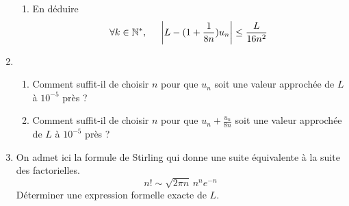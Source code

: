 \begin{enumerate}
\begin{enumerate}
 \item En déduire
\begin{displaymath}
 \forall k\in \mathbb{N}^*, \hspace{0.5cm}
 \left| L-(1+\frac{1}{8n})u_n\right| \leq \frac{L}{16n^2} 
\end{displaymath}
\end{enumerate}

 \item 
\begin{enumerate}
 \item Comment suffit-il de choisir $n$ pour que $u_n$ soit une valeur approchée de $L$ à $10^{-5}$ près ?
 \item Comment suffit-il de choisir $n$ pour que $u_n +\frac{u_n}{8n}$ soit une valeur approchée de $L$ à $10^{-5}$ près ?
\end{enumerate}


 \item
On admet ici la formule de Stirling qui donne une suite équivalente à la suite des factorielles.
\begin{displaymath}
 n! \sim \sqrt{2\pi n}\,n^n e^{-n}
\end{displaymath}
Déterminer une expression formelle exacte de $L$.
\end{enumerate}

